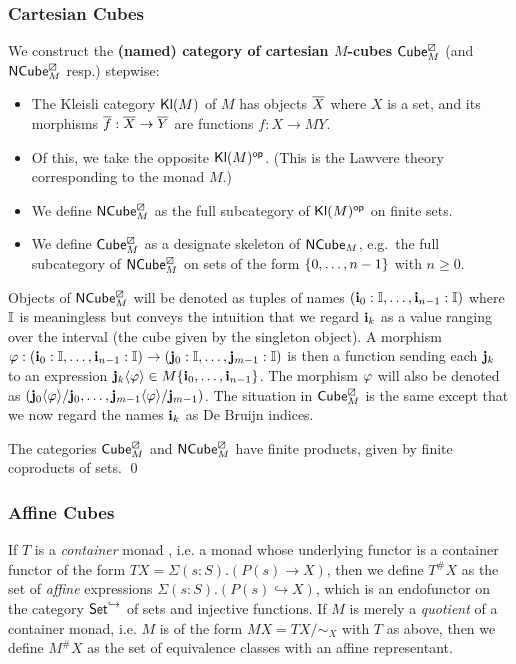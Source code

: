 \documentclass[a4paper]{article}
\begin{document}
\subsubsection{Cartesian Cubes}
\begin{definition}
	We construct the \textbf{(named) category of cartesian $M$-cubes} ${\mathsf{Cube}}^\boxslash_M$ (and ${\mathsf{NCube}}^\boxslash_M$ resp.) stepwise:
	\begin{itemize}
		\item The Kleisli category ${\mathsf{Kl}}(M)$ of $M$ has objects ${\overline{X}}$ where $X$ is a set, and its morphisms ${\overline{f}} : {\overline{X}} \to {\overline{Y}}$ are functions $f : X \to MY$.
		\item Of this, we take the opposite ${\mathsf{Kl}}(M)^{\mathsf{op}}$. (This is the Lawvere theory corresponding to the monad $M$.)
		\item We define ${\mathsf{NCube}}^\boxslash_M$ as the full subcategory of ${\mathsf{Kl}}(M)^{\mathsf{op}}$ on finite sets.
		\item We define ${\mathsf{Cube}}^\boxslash_M$ as a designate skeleton of ${\mathsf{NCube}}_M$, e.g.\ the full subcategory of ${\mathsf{NCube}}^\boxslash_M$ on sets of the form $\mathopen{}\left\{ 0, \ldots, n-1 \right\}\mathclose{}$ with $n \geq 0$.
	\end{itemize}
\end{definition}
Objects of ${\mathsf{NCube}}^\boxslash_M$ will be denoted as tuples of names $(\mathbf{i}_0 : {\mathbb I}, \ldots, \mathbf{i}_{n-1} : {\mathbb I})$ where ${\mathbb I}$ is meaningless but conveys the intuition that we regard $\mathbf{i}_k$ as a value ranging over the interval (the cube given by the singleton object).
A morphism $\varphi : (\mathbf{i}_0 : {\mathbb I}, \ldots, \mathbf{i}_{n-1} : {\mathbb I}) \to (\mathbf{j}_0 : {\mathbb I}, \ldots, \mathbf{j}_{m-1} : {\mathbb I})$ is then a function sending each $\mathbf{j}_k$ to an expression $\mathbf{j}_k \langle \varphi \rangle \in M\mathopen{}\left\{ \mathbf{i}_0, \ldots, \mathbf{i}_{n-1} \right\}\mathclose{}$.
The morphism $\varphi$ will also be denoted as $(\mathbf{j}_0 \langle \varphi \rangle / \mathbf{j}_0, \ldots, \mathbf{j}_{m-1} \langle \varphi \rangle / \mathbf{j}_{m-1})$.
The situation in ${\mathsf{Cube}}^\boxslash_M$ is the same except that we now regard the names $\mathbf{i}_k$ as De Bruijn indices.

\begin{corollary}
The categories ${\mathsf{Cube}}^\boxslash_M$ and ${\mathsf{NCube}}^\boxslash_M$ have finite products, given by finite coproducts of sets. \qed
\end{corollary}

\subsubsection{Affine Cubes}
If $T$ is a \emph{container} monad \cite{container-combinatorics}, i.e. a monad whose underlying functor is a container functor \cite{containers} of the form $TX = \Sigma(s : S).(P(s) \to X)$, then we define $T^\# X$ as the set of \emph{affine} expressions $\Sigma(s : S).(P(s) \hookrightarrow X)$, which is an endofunctor on the category ${\mathsf{Set}}^{\hookrightarrow}$ of sets and injective functions.
If $M$ is merely a \emph{quotient} of a container monad, i.e. $M$ is of the form $MX = TX/\sim_X$ with $T$ as above, then we define $M^\# X$ as the set of equivalence classes with an affine representant.
\end{document}
